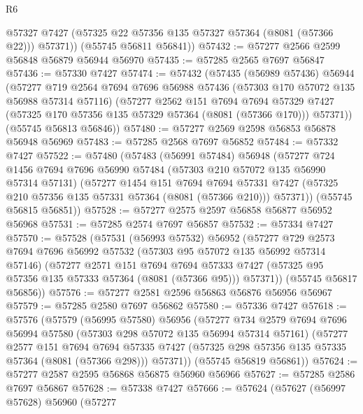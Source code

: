 \begin{lexlean}{R6}
\begin{coremodule}
          @57327
          @7427
          (@57325 @22 @57356 @135 @57327 @57364 (@8081 (@57366 @22)))
          @57371))
      (@55745 @56811 @56841))
@57432 := @57277 @2566 @2599 @56848 @56879 @56944 @56970
@57435 := @57285 @2565 @7697 @56847
@57436 := @57330 @7427
@57474 := @57432
    (@57435
      (@56989 @57436)
      @56944
      (@57277
        @719
        @2564
        @7694
        @7696
        @56988
        @57436
        (@57303 @170 @57072 @135 @56988 @57314 @57116)
        (@57277
          @2562
          @151
          @7694
          @7694
          @57329
          @7427
          (@57325 @170 @57356 @135 @57329 @57364 (@8081 (@57366 @170)))
          @57371))
      (@55745 @56813 @56846))
@57480 := @57277 @2569 @2598 @56853 @56878 @56948 @56969
@57483 := @57285 @2568 @7697 @56852
@57484 := @57332 @7427
@57522 := @57480
    (@57483
      (@56991 @57484)
      @56948
      (@57277
        @724
        @1456
        @7694
        @7696
        @56990
        @57484
        (@57303 @210 @57072 @135 @56990 @57314 @57131)
        (@57277
          @1454
          @151
          @7694
          @7694
          @57331
          @7427
          (@57325 @210 @57356 @135 @57331 @57364 (@8081 (@57366 @210)))
          @57371))
      (@55745 @56815 @56851))
@57528 := @57277 @2575 @2597 @56858 @56877 @56952 @56968
@57531 := @57285 @2574 @7697 @56857
@57532 := @57334 @7427
@57570 := @57528
    (@57531
      (@56993 @57532)
      @56952
      (@57277
        @729
        @2573
        @7694
        @7696
        @56992
        @57532
        (@57303 @95 @57072 @135 @56992 @57314 @57146)
        (@57277
          @2571
          @151
          @7694
          @7694
          @57333
          @7427
          (@57325 @95 @57356 @135 @57333 @57364 (@8081 (@57366 @95)))
          @57371))
      (@55745 @56817 @56856))
@57576 := @57277 @2581 @2596 @56863 @56876 @56956 @56967
@57579 := @57285 @2580 @7697 @56862
@57580 := @57336 @7427
@57618 := @57576
    (@57579
      (@56995 @57580)
      @56956
      (@57277
        @734
        @2579
        @7694
        @7696
        @56994
        @57580
        (@57303 @298 @57072 @135 @56994 @57314 @57161)
        (@57277
          @2577
          @151
          @7694
          @7694
          @57335
          @7427
          (@57325 @298 @57356 @135 @57335 @57364 (@8081 (@57366 @298)))
          @57371))
      (@55745 @56819 @56861))
@57624 := @57277 @2587 @2595 @56868 @56875 @56960 @56966
@57627 := @57285 @2586 @7697 @56867
@57628 := @57338 @7427
@57666 := @57624
    (@57627
      (@56997 @57628)
      @56960
      (@57277

\end{coremodule}
\end{lexlean}
